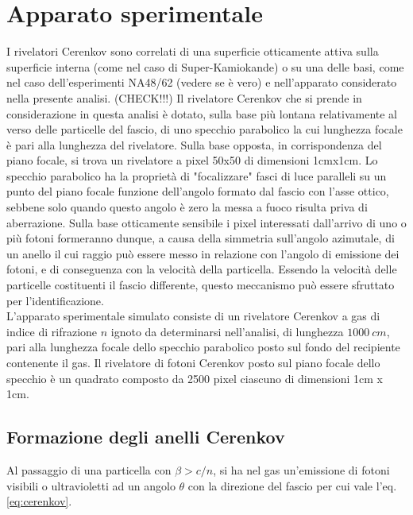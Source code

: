 \documentclass[8pt]{extarticle}
\begin{document}
\section{Apparato sperimentale} \label{sec:apparato}
I rivelatori Cerenkov sono correlati di una superficie otticamente attiva sulla superficie interna (come nel caso di Super-Kamiokande) o su una delle basi, come nel caso dell'esperimenti NA48/62 (vedere se è vero) e nell'apparato considerato nella presente analisi. (CHECK!!!) Il rivelatore Cerenkov
che si prende in considerazione in questa analisi è dotato, sulla base più lontana relativamente al verso delle particelle del fascio, di uno specchio parabolico la cui lunghezza focale è pari alla lunghezza del rivelatore. Sulla base opposta, in corrispondenza del piano focale, si trova un rivelatore a pixel 50x50 di dimensioni 1cmx1cm. Lo specchio parabolico ha la proprietà di "focalizzare" fasci di luce paralleli su un punto del piano focale funzione dell'angolo formato dal fascio con l'asse ottico, sebbene solo quando questo angolo è zero la messa a fuoco risulta priva di aberrazione. Sulla base otticamente sensibile i pixel interessati dall'arrivo di uno o più fotoni formeranno dunque, a causa della simmetria sull'angolo azimutale, di un anello il cui raggio può essere messo in relazione con l'angolo di emissione dei fotoni, e di conseguenza con la velocità della particella. Essendo la velocità delle particelle costituenti il fascio differente, questo meccanismo può essere sfruttato per l'identificazione. \\

L'apparato sperimentale simulato consiste di un rivelatore Cerenkov a gas di indice di rifrazione $n$ ignoto da determinarsi nell'analisi, di lunghezza $1000 \ cm$, pari alla lunghezza focale dello specchio parabolico posto sul fondo del recipiente contenente il gas. Il rivelatore di fotoni Cerenkov posto sul piano focale dello specchio è un quadrato composto da 2500 pixel ciascuno di dimensioni 1cm x 1cm. \\
\subsection{Formazione degli anelli Cerenkov}
Al passaggio di una particella con $\beta > c/n$, si ha nel gas un'emissione di fotoni visibili o ultravioletti ad un angolo $\theta$ con la direzione del fascio per cui vale l'eq. \eqref{eq:cerenkov}. \\
\end{document}
